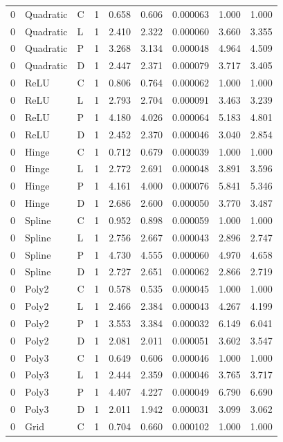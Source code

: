 \begin{longtable}{lllrrrrrr}
0 & Quadratic & C & 1 & 0.658 & 0.606 & 0.000063 & 1.000 & 1.000 \\
0 & Quadratic & L & 1 & 2.410 & 2.322 & 0.000060 & 3.660 & 3.355 \\
0 & Quadratic & P & 1 & 3.268 & 3.134 & 0.000048 & 4.964 & 4.509 \\
0 & Quadratic & D & 1 & 2.447 & 2.371 & 0.000079 & 3.717 & 3.405 \\
0 & ReLU & C & 1 & 0.806 & 0.764 & 0.000062 & 1.000 & 1.000 \\
0 & ReLU & L & 1 & 2.793 & 2.704 & 0.000091 & 3.463 & 3.239 \\
0 & ReLU & P & 1 & 4.180 & 4.026 & 0.000064 & 5.183 & 4.801 \\
0 & ReLU & D & 1 & 2.452 & 2.370 & 0.000046 & 3.040 & 2.854 \\
0 & Hinge & C & 1 & 0.712 & 0.679 & 0.000039 & 1.000 & 1.000 \\
0 & Hinge & L & 1 & 2.772 & 2.691 & 0.000048 & 3.891 & 3.596 \\
0 & Hinge & P & 1 & 4.161 & 4.000 & 0.000076 & 5.841 & 5.346 \\
0 & Hinge & D & 1 & 2.686 & 2.600 & 0.000050 & 3.770 & 3.487 \\
0 & Spline & C & 1 & 0.952 & 0.898 & 0.000059 & 1.000 & 1.000 \\
0 & Spline & L & 1 & 2.756 & 2.667 & 0.000043 & 2.896 & 2.747 \\
0 & Spline & P & 1 & 4.730 & 4.555 & 0.000060 & 4.970 & 4.658 \\
0 & Spline & D & 1 & 2.727 & 2.651 & 0.000062 & 2.866 & 2.719 \\
0 & Poly2 & C & 1 & 0.578 & 0.535 & 0.000045 & 1.000 & 1.000 \\
0 & Poly2 & L & 1 & 2.466 & 2.384 & 0.000043 & 4.267 & 4.199 \\
0 & Poly2 & P & 1 & 3.553 & 3.384 & 0.000032 & 6.149 & 6.041 \\
0 & Poly2 & D & 1 & 2.081 & 2.011 & 0.000051 & 3.602 & 3.547 \\
0 & Poly3 & C & 1 & 0.649 & 0.606 & 0.000046 & 1.000 & 1.000 \\
0 & Poly3 & L & 1 & 2.444 & 2.359 & 0.000046 & 3.765 & 3.717 \\
0 & Poly3 & P & 1 & 4.407 & 4.227 & 0.000049 & 6.790 & 6.690 \\
0 & Poly3 & D & 1 & 2.011 & 1.942 & 0.000031 & 3.099 & 3.062 \\
0 & Grid & C & 1 & 0.704 & 0.660 & 0.000102 & 1.000 & 1.000 \\

\end{longtable}
